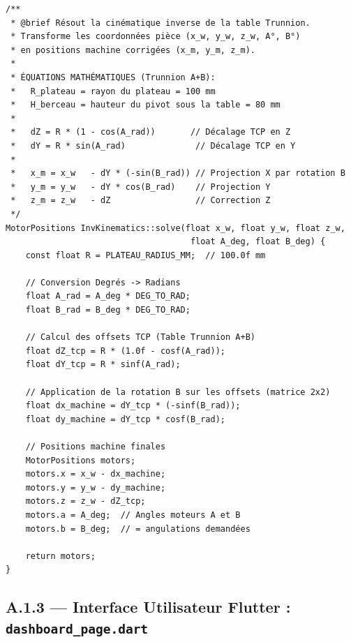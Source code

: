 \begin{tcolorbox}[colback=gray!5, colframe=macouleur, title=\texttt{InvKinematics.cpp} -- Calcul des compensations TCP Trunnion]
\begin{verbatim}
/**
 * @brief Résout la cinématique inverse de la table Trunnion.
 * Transforme les coordonnées pièce (x_w, y_w, z_w, A°, B°)
 * en positions machine corrigées (x_m, y_m, z_m).
 *
 * ÉQUATIONS MATHÉMATIQUES (Trunnion A+B):
 *   R_plateau = rayon du plateau = 100 mm
 *   H_berceau = hauteur du pivot sous la table = 80 mm
 *
 *   dZ = R * (1 - cos(A_rad))       // Décalage TCP en Z
 *   dY = R * sin(A_rad)              // Décalage TCP en Y
 *
 *   x_m = x_w   - dY * (-sin(B_rad)) // Projection X par rotation B
 *   y_m = y_w   - dY * cos(B_rad)    // Projection Y
 *   z_m = z_w   - dZ                 // Correction Z
 */
MotorPositions InvKinematics::solve(float x_w, float y_w, float z_w,
                                     float A_deg, float B_deg) {
    const float R = PLATEAU_RADIUS_MM;  // 100.0f mm
    
    // Conversion Degrés -> Radians
    float A_rad = A_deg * DEG_TO_RAD;
    float B_rad = B_deg * DEG_TO_RAD;
    
    // Calcul des offsets TCP (Table Trunnion A+B)
    float dZ_tcp = R * (1.0f - cosf(A_rad));
    float dY_tcp = R * sinf(A_rad);
    
    // Application de la rotation B sur les offsets (matrice 2x2)
    float dx_machine = dY_tcp * (-sinf(B_rad));
    float dy_machine = dY_tcp * cosf(B_rad);
    
    // Positions machine finales
    MotorPositions motors;
    motors.x = x_w - dx_machine;
    motors.y = y_w - dy_machine;
    motors.z = z_w - dZ_tcp;
    motors.a = A_deg;  // Angles moteurs A et B
    motors.b = B_deg;  // = angulations demandées
    
    return motors;
}
\end{verbatim}
\end{tcolorbox}

\subsection{A.1.3 — Interface Utilisateur Flutter : \texttt{dashboard\_page.dart}}

